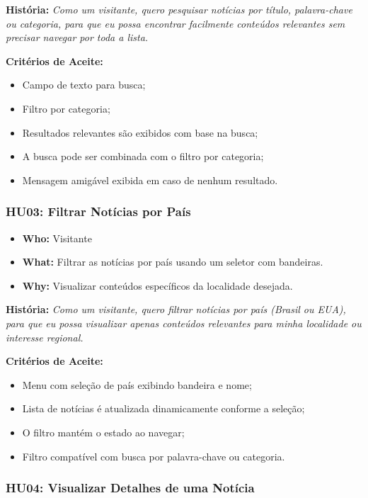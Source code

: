 \noindent \textbf{História:} \textit{Como um visitante, quero pesquisar notícias por título, palavra-chave ou categoria, para que eu possa encontrar facilmente conteúdos relevantes sem precisar navegar por toda a lista.}

\noindent \textbf{Critérios de Aceite:}
\begin{itemize}
  \item Campo de texto para busca;
  \item Filtro por categoria;
  \item Resultados relevantes são exibidos com base na busca;
  \item A busca pode ser combinada com o filtro por categoria;
  \item Mensagem amigável exibida em caso de nenhum resultado.
\end{itemize}

\subsubsection*{HU03: Filtrar Notícias por País}

\begin{itemize}
  \item \textbf{Who:} Visitante
  \item \textbf{What:} Filtrar as notícias por país usando um seletor com bandeiras.
  \item \textbf{Why:} Visualizar conteúdos específicos da localidade desejada.
\end{itemize}

\noindent \textbf{História:} \textit{Como um visitante, quero filtrar notícias por país (Brasil ou EUA), para que eu possa visualizar apenas conteúdos relevantes para minha localidade ou interesse regional.}

\noindent \textbf{Critérios de Aceite:}
\begin{itemize}
  \item Menu com seleção de país exibindo bandeira e nome;
  \item Lista de notícias é atualizada dinamicamente conforme a seleção;
  \item O filtro mantém o estado ao navegar;
  \item Filtro compatível com busca por palavra-chave ou categoria.
\end{itemize}

\subsubsection*{HU04: Visualizar Detalhes de uma Notícia}

